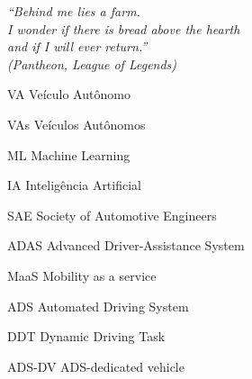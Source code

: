 \documentclass[
	12pt,				%
	openany, %
	a4paper,			%
	english,			%
	french,				%
	spanish,			%
	brazil				%
	]{abntex2}
\let\cleardoublepage\clearpage %
\begin{document}



\begin{epigrafe}
	\vspace*{\fill}
	\begin{flushright}
		\textit{``Behind me lies a farm. \\
			I wonder if there is bread above the hearth \\
			and if I will ever return.'' \\
			(Pantheon, League of Legends)}
	\end{flushright}
\end{epigrafe}





\listoffigures*
\cleardoublepage




\begin{siglas} \label{eq:1}
	\item[VA] Veículo Autônomo 
	\item[VAs] Veículos Autônomos
	\item[ML] Machine Learning
	\item[IA] Inteligência Artificial
	\item[SAE] Society of Automotive Engineers
	\item[ADAS] Advanced Driver-Assistance System
	\item[MaaS] Mobility as a service
	\item[ADS] Automated Driving System
	\item[DDT] Dynamic Driving Task
	\item[ADS-DV] ADS-dedicated vehicle
\end{siglas}
\end{document}
